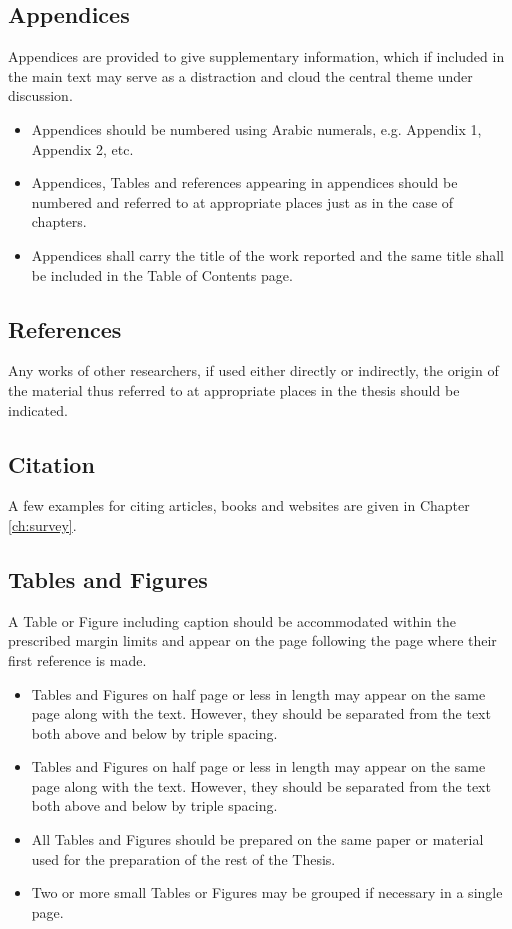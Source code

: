 \subsection{Appendices}
Appendices are provided to give supplementary information, which if included in the main text may serve as a distraction and cloud the central theme under discussion.
\begin{itemize}
 \item Appendices should be numbered using Arabic numerals, e.g. Appendix 1, Appendix 2, etc.
\item  Appendices, Tables and references appearing in appendices should be numbered and referred to at appropriate places just as in the case of chapters.
\item Appendices shall carry the title of the work reported and the same title shall be included in the Table of Contents page.
\end{itemize}
\subsection{References}
Any works of other researchers, if used either directly or indirectly, the origin of the material thus referred to at appropriate places in the thesis should be indicated. 
\subsection{Citation}
A few examples for citing articles, books and websites are given in Chapter \ref{ch:survey}. 
\subsection{Tables and Figures}
A Table or Figure including caption should be accommodated within the prescribed margin limits and appear on the page following the page where their first reference is made.
\begin{itemize}
 \item Tables and Figures on half page or less in length may appear on the same page along with the text. However, they should be separated from the text both above and below by triple spacing.
\item Tables and Figures on half page or less in length may appear on the same page along with the text. However, they should be separated from the text both above and below by triple spacing.
\item All Tables and Figures should be prepared on the same paper or material used for the preparation of the rest of the Thesis.
\item Two or more small Tables or Figures may be grouped if necessary in a single page.
\end{itemize}
